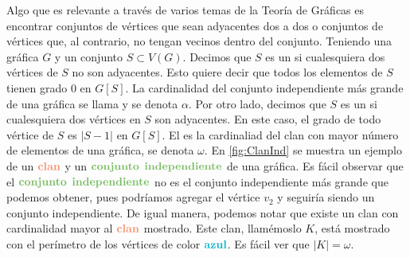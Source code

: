     Algo que es relevante a trav\'es de varios temas de la Teor\'ia de
     Gr\'aficas es encontrar conjuntos de v\'ertices que sean adyacentes dos a
     dos o conjuntos de v\'ertices que, al contrario, no tengan vecinos dentro
     del conjunto. Teniendo una gr\'afica $G$ y un conjunto $S \subset V(G)$.
     Decimos que $S$ es un  si cualesquiera dos
     v\'ertices de $S$ no son adyacentes. Esto quiere decir que todos los
     elementos de $S$ tienen grado $0$ en $G[S]$. La cardinalidad del conjunto
     independiente m\'as grande de una gr\'afica se llama  y se denota $\alpha$. Por otro lado, decimos que $S$ es un
      si cualesquiera dos v\'ertices en $S$ son adyacentes. En este
     caso, el grado de todo v\'ertice de $S$ es $|S-1|$ en $G[S]$. El
      es la cardinaliad del clan con mayor n\'umero de
     elementos de una gr\'afica, se denota $\omega$. En \cref{fig:ClanInd} se
     muestra un ejemplo de un ${\color{coral}\bf clan}$ y un ${\color{verde}\bf
     conjunto}$ ${\color{verde}\bf independiente}$ de una gr\'afica. Es f\'acil
     observar que el ${\color{verde}\bf conjunto}$ ${\color{verde}\bf
     independiente}$ no es el conjunto independiente m\'as grande que podemos
     obtener, pues podr\'iamos agregar el v\'ertice $v_2$ y seguir\'ia siendo un
     conjunto independiente. De igual manera, podemos notar que existe un clan
     con cardinalidad mayor al ${\color{coral}\bf clan}$ mostrado. Este clan,
     llam\'emoslo $K$, est\'a mostrado con el per\'imetro de los v\'ertices de
     color ${\color{azulCielo}\bf azul}$. Es f\'acil ver que $|K| = \omega$.


